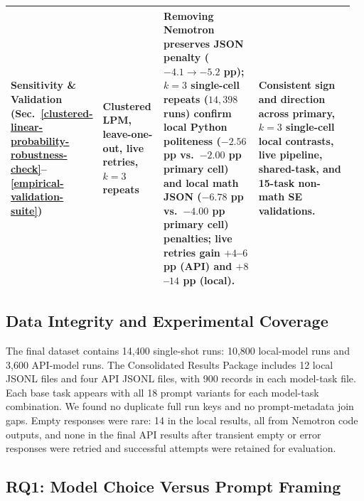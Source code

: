 \documentclass[a4paper,fleqn]{cas-sc}
\begin{document}
\begin{table}[htbp]
\begin{tabular}{@{}p{0.15\linewidth}p{0.18\linewidth}p{0.31\linewidth}p{0.32\linewidth}@{}}
\addlinespace[3pt]
\textbf{Sensitivity \& Validation} \newline (Sec.~\ref{clustered-linear-probability-robustness-check}--\ref{empirical-validation-suite}) & Clustered LPM, leave-one-out, live retries, $k = 3$ repeats & Removing Nemotron preserves JSON penalty ($-4.1 \to -5.2$ pp); $k = 3$ single-cell repeats ($14{,}398$ runs) confirm local Python politeness ($-2.56$ pp vs.\ $-2.00$ pp primary cell) and local math JSON ($-6.78$ pp vs.\ $-4.00$ pp primary cell) penalties; live retries gain $+4$--$6$ pp (API) and $+8$--$14$ pp (local). & Consistent sign and direction across primary, $k = 3$ single-cell local contrasts, live pipeline, shared-task, and 15-task non-math SE validations. \\
\bottomrule
\end{tabular}
\end{table}

\subsection{Data Integrity and Experimental Coverage}\label{data-integrity-and-run-coverage}

The final dataset contains 14,400 single-shot runs: 10,800 local-model runs and 3,600 API-model runs. The Consolidated Results Package includes 12 local JSONL files and four API JSONL files, with 900 records in each model-task file. Each base task appears with all 18 prompt variants for each model-task combination. We found no duplicate full run keys and no prompt-metadata join gaps. Empty responses were rare: 14 in the local results, all from Nemotron code outputs, and none in the final API results after transient empty or error responses were retried and successful attempts were retained for evaluation.

\subsection{RQ1: Model Choice Versus Prompt Framing}\label{model-ability-dominates-correctness}
\end{document}
